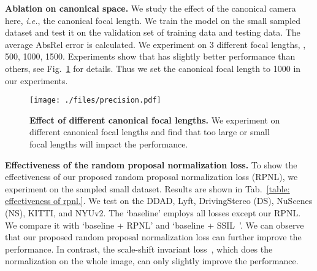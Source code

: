 \noindent\textbf{Ablation on canonical space.}
We study the effect of the canonical camera here, \textit{i.e.}, the canonical focal length. We train the model on the small sampled dataset and test it on the validation set of training data and testing data. The average AbsRel error is calculated.  We experiment on 3 different focal lengths, \ie, 500, 1000, 1500. Experiments show that  has slightly better performance than others, see Fig.~\ref{fig: canonical focal length.} for details. Thus we set the canonical focal length to 1000 in our experiments.

\begin{figure}[]
\centering
\texttt{[image: ./files/precision.pdf]}
\caption{\textbf{Effect of different canonical focal lengths.} We experiment on different canonical focal lengths and find that too large or small focal lengths will impact the performance. }
\label{fig: canonical focal length.}
\end{figure}

\noindent\textbf{Effectiveness of 
the random proposal normalization loss.}
To show the effectiveness of our proposed random proposal normalization loss (RPNL), we experiment on the sampled small dataset. Results are shown in Tab.~\ref{table: effectiveness of rpnl.}. We test on the DDAD, Lyft, DrivingStereo (DS), NuScenes (NS), KITTI, and NYUv2.  The `baseline' employs all losses except our RPNL. We compare it with `baseline + RPNL' and `baseline + SSIL~\cite{Ranftl2020}'. We can observe that our proposed random proposal normalization loss can further improve the performance. 
In 
contrast, the scale-shift invariant loss~\cite{Ranftl2020}, which does the normalization on the whole image, can only slightly improve the performance. 
\begin{table}[]
\caption{Effectiveness of random proposal normalization loss. Baseline is supervised by `'. SSIL is the scale-shift invariant loss proposed in ~\cite{Ranftl2020}.}
\vspace{-1 em}
\label{table: effectiveness of rpnl.}
\vspace{-2 em}
\end{table}



